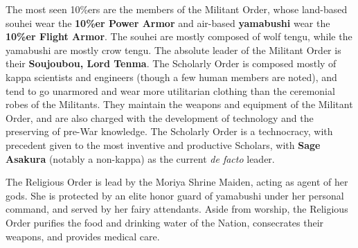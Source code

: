 \documentclass[a4paper,12pt]{book}
\begin{document}
The most seen 10\%ers are the members of the Militant Order, whose land-based souhei wear the \textbf{10\%er Power Armor} and air-based \textbf{yamabushi} wear the \textbf{10\%er Flight Armor}. The souhei are mostly composed of wolf tengu, while the yamabushi are mostly crow tengu. The absolute leader of the Militant Order is their \textbf{Soujoubou, Lord Tenma}. The Scholarly Order is composed mostly of kappa scientists and engineers (though a few human members are noted), and tend to go unarmored and wear more utilitarian clothing than the ceremonial robes of the Militants. They maintain the weapons and equipment of the Militant Order, and are also charged with the development of technology and the preserving of pre-War knowledge. The Scholarly Order is a technocracy, with precedent given to the most inventive and productive Scholars, with \textbf{Sage Asakura} (notably a non-kappa) as the current \emph{de facto} leader.

The Religious Order is lead by the Moriya Shrine Maiden, acting as agent of her gods. She is protected by an elite honor guard of yamabushi under her personal command, and served by her fairy attendants. Aside from worship, the Religious Order purifies the food and drinking water of the Nation, consecrates their weapons, and provides medical care. 
\end{document}
